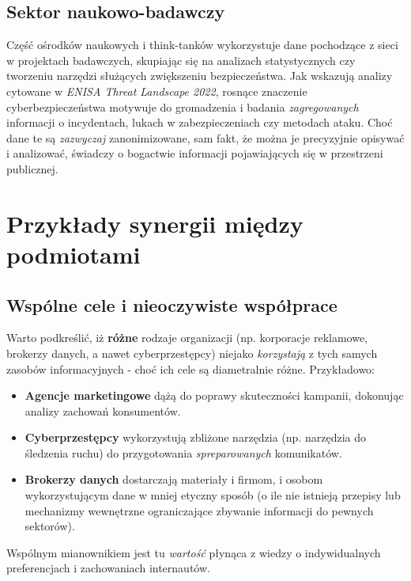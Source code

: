 \subsection{Sektor naukowo-badawczy}
Część ośrodków naukowych i think-tanków wykorzystuje dane pochodzące z sieci w projektach badawczych, skupiając się na analizach statystycznych czy tworzeniu narzędzi służących zwiększeniu bezpieczeństwa. Jak wskazują analizy cytowane w \emph{ENISA Threat Landscape 2022}, rosnące znaczenie cyberbezpieczeństwa motywuje do gromadzenia i badania \emph{zagregowanych} informacji o incydentach, lukach w zabezpieczeniach czy metodach ataku. Choć dane te są \emph{zazwyczaj} zanonimizowane, sam fakt, że można je precyzyjnie opisywać i analizować, świadczy o bogactwie informacji pojawiających się w przestrzeni publicznej.

\vspace{1em}

\section{Przykłady synergii między podmiotami}

\subsection{Wspólne cele i nieoczywiste współprace}
Warto podkreślić, iż \textbf{różne} rodzaje organizacji (np. korporacje reklamowe, brokerzy danych, a nawet cyberprzestępcy) niejako \emph{korzystają} z tych samych zasobów informacyjnych - choć ich cele są diametralnie różne. Przykładowo:
\begin{itemize}
    \item \textbf{Agencje marketingowe} dążą do poprawy skuteczności kampanii, dokonując analizy zachowań konsumentów.
    \item \textbf{Cyberprzestępcy} wykorzystują zbliżone narzędzia (np. narzędzia do śledzenia ruchu) do przygotowania \emph{spreparowanych} komunikatów.
    \item \textbf{Brokerzy danych} dostarczają materiały i firmom, i osobom wykorzystującym dane w mniej etyczny sposób (o ile nie istnieją przepisy lub mechanizmy wewnętrzne ograniczające zbywanie informacji do pewnych sektorów).
\end{itemize}
Wspólnym mianownikiem jest tu \emph{wartość} płynąca z wiedzy o indywidualnych preferencjach i zachowaniach internautów.

